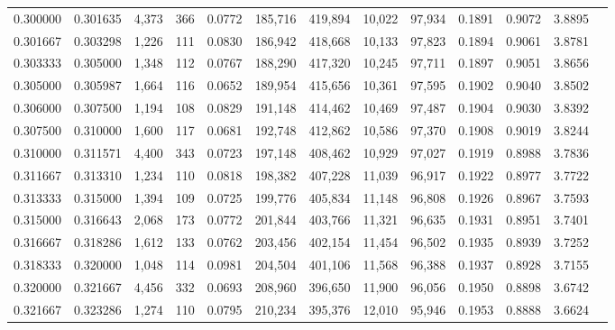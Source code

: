 \begin{tabular}{rrrrrrrrrrrrr}
0.300000 & 0.301635 & 4,373 & 366 &                                     0.0772 & 185,716 & 419,894 &  10,022 &  97,934 & 0.1891 & 0.9072 & 3.8895 \\
0.301667 & 0.303298 & 1,226 & 111 &                                     0.0830 & 186,942 & 418,668 &  10,133 &  97,823 & 0.1894 & 0.9061 & 3.8781 \\
0.303333 & 0.305000 & 1,348 & 112 &                                     0.0767 & 188,290 & 417,320 &  10,245 &  97,711 & 0.1897 & 0.9051 & 3.8656 \\
0.305000 & 0.305987 & 1,664 & 116 &                                     0.0652 & 189,954 & 415,656 &  10,361 &  97,595 & 0.1902 & 0.9040 & 3.8502 \\
0.306000 & 0.307500 & 1,194 & 108 &                                     0.0829 & 191,148 & 414,462 &  10,469 &  97,487 & 0.1904 & 0.9030 & 3.8392 \\
0.307500 & 0.310000 & 1,600 & 117 &                                     0.0681 & 192,748 & 412,862 &  10,586 &  97,370 & 0.1908 & 0.9019 & 3.8244 \\
0.310000 & 0.311571 & 4,400 & 343 &                                     0.0723 & 197,148 & 408,462 &  10,929 &  97,027 & 0.1919 & 0.8988 & 3.7836 \\
0.311667 & 0.313310 & 1,234 & 110 &                                     0.0818 & 198,382 & 407,228 &  11,039 &  96,917 & 0.1922 & 0.8977 & 3.7722 \\
0.313333 & 0.315000 & 1,394 & 109 &                                     0.0725 & 199,776 & 405,834 &  11,148 &  96,808 & 0.1926 & 0.8967 & 3.7593 \\
0.315000 & 0.316643 & 2,068 & 173 &                                     0.0772 & 201,844 & 403,766 &  11,321 &  96,635 & 0.1931 & 0.8951 & 3.7401 \\
0.316667 & 0.318286 & 1,612 & 133 &                                     0.0762 & 203,456 & 402,154 &  11,454 &  96,502 & 0.1935 & 0.8939 & 3.7252 \\
0.318333 & 0.320000 & 1,048 & 114 &                                     0.0981 & 204,504 & 401,106 &  11,568 &  96,388 & 0.1937 & 0.8928 & 3.7155 \\
0.320000 & 0.321667 & 4,456 & 332 &                                     0.0693 & 208,960 & 396,650 &  11,900 &  96,056 & 0.1950 & 0.8898 & 3.6742 \\
0.321667 & 0.323286 & 1,274 & 110 &                                     0.0795 & 210,234 & 395,376 &  12,010 &  95,946 & 0.1953 & 0.8888 & 3.6624 \\

\end{tabular}
